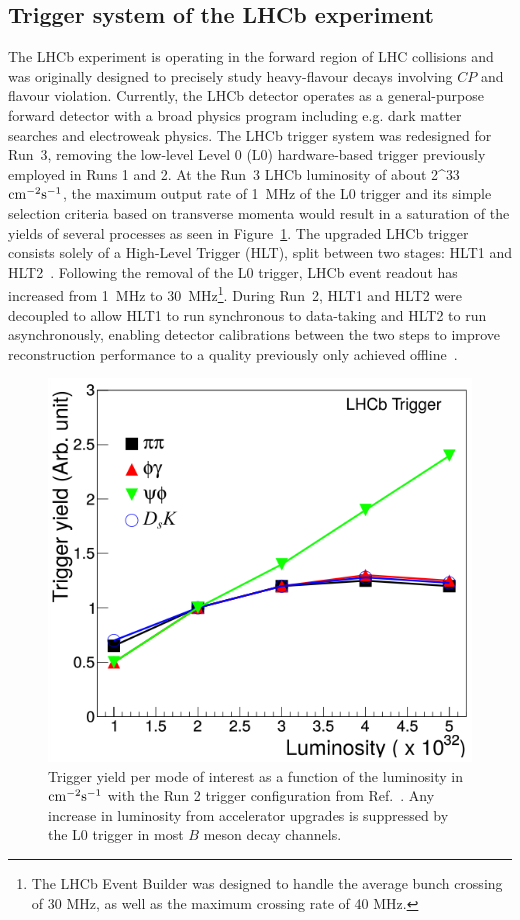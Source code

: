 \subsection{Trigger system of the LHCb experiment}

The LHCb experiment is operating in the forward region of LHC collisions and was originally designed to precisely study heavy-flavour decays involving $CP$ and flavour violation. Currently, the LHCb detector operates as a general-purpose forward detector with a broad physics program including e.g. dark matter searches and electroweak physics. The LHCb trigger system was redesigned for Run~3, removing the low-level Level 0 (L0) hardware-based trigger previously employed in Runs 1 and 2. At the Run~3 LHCb luminosity of about 2^{33}${\rm cm}^{-2}{\rm s}^{-1}$, the maximum output rate of \SI{1}{\mega\hertz} of the L0 trigger and its simple selection criteria based on transverse momenta would result in a saturation of the yields of several processes as seen in Figure~\ref{fig:LHCbL0TriggerYield}. The upgraded LHCb trigger consists solely of a High-Level Trigger (HLT), split between two stages: HLT1 and HLT2~\cite{Aaij:2019uij}. Following the removal of the L0 trigger, LHCb event readout has increased from \SI{1}{\mega\hertz} to \SI{30}{\mega\hertz}\footnote{The LHCb Event Builder was designed to handle the average bunch crossing of 30 MHz, as well as the maximum crossing rate of 40 MHz.}. During Run~2, HLT1 and HLT2 were decoupled to allow HLT1 to run synchronous to data-taking and HLT2 to run asynchronously, enabling detector calibrations between the two steps to improve reconstruction performance to a quality previously only achieved offline~\cite{LHCb:Albrecht_2015}. 

\begin{figure}[h!]
    \centering
    \includegraphics[width=0.55\linewidth]{images/lhcb/LHCb-L0-yield.png}
    \caption{Trigger yield per mode of interest as a function of the luminosity in ${\rm cm}^{-2}{\rm s}^{-1}$ with the Run 2 trigger configuration from Ref.~\cite{LHCb:upgrade-piucci}. Any increase in luminosity from accelerator upgrades is suppressed by the L0 trigger in most $B$ meson decay channels.}
    \label{fig:LHCbL0TriggerYield}
\end{figure}

